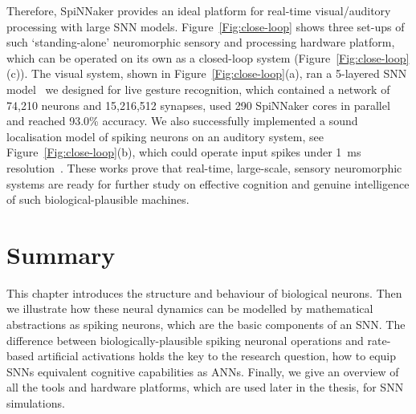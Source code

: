 Therefore, SpiNNaker provides an ideal platform for real-time visual/auditory processing with large SNN models.
Figure~\ref{Fig:close-loop} shows three set-ups of such `standing-alone' neuromorphic sensory and processing hardware platform, which can be operated on its own as a closed-loop system (Figure~\ref{Fig:close-loop}(c)).
The visual system, shown in Figure~\ref{Fig:close-loop}(a), ran a 5-layered SNN model~\cite{liu2014real} we designed for live gesture recognition, which contained a network of 74,210 neurons and 15,216,512 synapses, used 290 SpiNNaker cores in parallel and reached 93.0\% accuracy. 
We also successfully implemented a sound localisation model of spiking neurons on an auditory system, see Figure~\ref{Fig:close-loop}(b), which could operate input spikes under 1~ms resolution~\cite{lagorce2015breaking}.
These works prove that real-time, large-scale, sensory neuromorphic systems are ready for further study on effective cognition and genuine intelligence of such biological-plausible machines.

\section{Summary}
This chapter introduces the structure and behaviour of biological neurons.
Then we illustrate how these neural dynamics can be modelled by mathematical abstractions as spiking neurons, which are the basic components of an SNN.
The difference between biologically-plausible spiking neuronal operations and rate-based artificial activations holds the key to the research question, how to equip SNNs equivalent cognitive capabilities as ANNs.
Finally, we give an overview of all the tools and hardware platforms, which are used later in the thesis, for SNN simulations.
